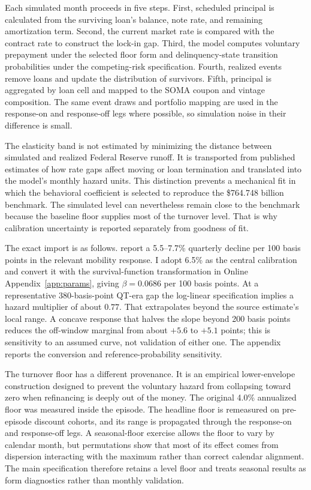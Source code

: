 Each simulated month proceeds in five steps. First, scheduled principal is calculated from the surviving loan's balance, note rate, and remaining amortization term. Second, the current market rate is compared with the contract rate to construct the lock-in gap. Third, the model computes voluntary prepayment under the selected floor form and delinquency-state transition probabilities under the competing-risk specification. Fourth, realized events remove loans and update the distribution of survivors. Fifth, principal is aggregated by loan cell and mapped to the SOMA coupon and vintage composition. The same event draws and portfolio mapping are used in the response-on and response-off legs where possible, so simulation noise in their difference is small.

The elasticity band is not estimated by minimizing the distance between simulated and realized Federal Reserve runoff. It is transported from published estimates of how rate gaps affect moving or loan termination and translated into the model's monthly hazard units. This distinction prevents a mechanical fit in which the behavioral coefficient is selected to reproduce the \$764.748 billion benchmark. The simulated level can nevertheless remain close to the benchmark because the baseline floor supplies most of the turnover level. That is why calibration uncertainty is reported separately from goodness of fit.

The exact import is as follows. \citet{liebersohn2024} report a 5.5--7.7\% quarterly decline per 100 basis points in the relevant mobility response. I adopt 6.5\% as the central calibration and convert it with the survival-function transformation in Online Appendix~\ref{app:params}, giving $\beta=0.0686$ per 100 basis points. At a representative 380-basis-point QT-era gap the log-linear specification implies a hazard multiplier of about $0.77$. That extrapolates beyond the source estimate's local range. A concave response that halves the slope beyond 200 basis points reduces the off-window marginal from about $+5.6$ to $+5.1$ points; this is sensitivity to an assumed curve, not validation of either one. The appendix reports the conversion and reference-probability sensitivity.

The turnover floor has a different provenance. It is an empirical lower-envelope construction designed to prevent the voluntary hazard from collapsing toward zero when refinancing is deeply out of the money. The original 4.0\% annualized floor was measured inside the episode. The headline floor is remeasured on pre-episode discount cohorts, and its range is propagated through the response-on and response-off legs. A seasonal-floor exercise allows the floor to vary by calendar month, but permutations show that most of its effect comes from dispersion interacting with the maximum rather than correct calendar alignment. The main specification therefore retains a level floor and treats seasonal results as form diagnostics rather than monthly validation.

